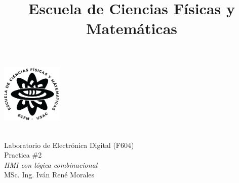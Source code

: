 \documentclass[11pt, letterpaper]{article} %
\title{Escuela de Ciencias Físicas y Matemáticas}
\makeatletter
\let\thetitle\@title
\newcommand{\hoofding}[5]{ %
\begin{flushleft}
\includegraphics[height=2.8cm]{images/logoecfm.png} %
\end{flushleft}
\vspace{-3cm} %
\hspace{4cm} 
\parbox{15cm}{ #1\\#2\\#3\\#4\\#5} %
{\parindent=0pt \hrulefill} 
\vspace{1mm}}
\makeatother
\begin{document}
\setlength{\parindent}{1cm}%

\hoofding {\thetitle}{Laboratorio de Electrónica Digital (F604)}{Practica $\#$2}
{\textit{HMI con lógica combinacional}}{MSc. Ing. Iván René Morales}%


%
%
\end{document}

